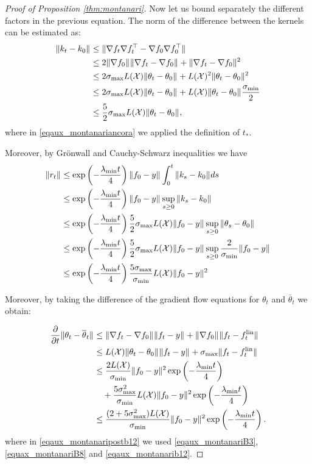 \documentclass{article}
\theoremstyle{definition}
\theoremstyle{remark}
\numberwithin{equation}{section}
\newcommand{\X}{\mathcal{X}}
\newcommand{\lin}{{\textup{lin}}}
\newcommand{\lammin}{\lambda_{\textup{min}}}
\newcommand{\sigmin}{\sigma_{\textup{min}}}
\newcommand{\sigmax}{\sigma_{\textup{max}}}
\newcommand{\norm}[2]{
    \|#1\|_{#2}
}
\newcommand{\partv}[1]{
    \frac{\partial}{\partial #1}
}
\begin{document}
\begin{proof}[Proof of Proposition \ref{thm:montanari}]
         Now let us bound separately the different factors in the previous equation.
         The norm of the difference between the kernels can be estimated as:
         \begin{align}
         	\norm{k_t-k_0}{} &\le \norm{\nabla f_t \nabla f_t^\top - \nabla f_0 \nabla f_0^\top}{}\\
            &\le 2\norm{\nabla f_0}{}\norm{\nabla f_t-\nabla f_0}{} + \norm{\nabla f_t-\nabla f_0}{}^2 \\
         	&\le 2\sigmax L(\X) \norm{\theta_t-\theta_0}{} + L(\X)^2 \norm{\theta_t-\theta_0}{}^2 \\
         	&\le \label{eqaux_montanariancora}2\sigmax L(\X) \norm{\theta_t-\theta_0}{} + L(\X) \norm{\theta_t-\theta_0}{}\frac{\sigmin}{2} \\
         	&\le \frac{5}{2}\sigmax L(\X) \norm{\theta_t-\theta_0}{},
         \end{align}
         where in \eqref{eqaux_montanariancora} we applied the definition of $t_*$.
         
         Moreover, by Grönwall and Cauchy-Schwarz inequalities we have
         \begin{align}
         	\norm{r_t}{} &\le \exp\left(-\frac{\lammin t}{4}\right)\norm{f_0-y}{}\int_0^t\norm{k_s-k_0}{}ds \\
            &\le\exp\left(-\frac{\lammin t}{4}\right)\norm{f_0-y}{}\sup_{s \ge 0}\norm{k_s-k_0}{} \\
            &\le\exp\left(-\frac{\lammin t}{4}\right)\frac{5}{2}\sigmax L(\X) \norm{f_0-y}{}\sup_{s \ge 0}\norm{\theta_s-\theta_0}{} \\
            &\le\exp\left(-\frac{\lammin t}{4}\right)\frac{5}{2}\sigmax L(\X) \norm{f_0-y}{}\sup_{s \ge 0}\frac{2}{\sigmin}\norm{f_0-y}{} \\
            &\label{eqaux_montanarib12}\le\exp\left(-\frac{\lammin t}{4}\right)\frac{5\sigmax}{\sigmin} L(\X) \norm{f_0-y}{}^2 \\
         \end{align}

    Moreover, by taking the difference of the gradient flow equations for $\theta_t$ and $\overline \theta_t$ we obtain:

\begin{align}
    \partv t \norm{\theta_t-\overline \theta_t}{} &\le \norm{\nabla f_t - \nabla f_0}{}\norm{f_t-y}{} + \norm{\nabla f_0}{}\norm{f_t-f_t^\lin}{} \\
    &\le L(\X) \norm{\theta_t-\theta_0}{}\norm{f_t-y}{} + \sigmax \norm{f_t-f_t^\lin}{}\\
    &\label{eqaux_montanaripostb12}\le \frac{2L(\X)}{\sigmin} \norm{f_0-y}{}^2 \exp\left(-\frac{\lammin t}{4}\right)\\
    &\quad + \frac{5\sigmax^2}{\sigmin} L(\X) \norm{f_0-y}{}^2 \exp\left(-\frac{\lammin t}{4}\right)\\
    &\le \frac{ (2+5\sigmax^2)L(\X)}{\sigmin} \norm{f_0-y}{}^2 \exp\left(-\frac{\lammin t}{4}\right).
\end{align}
where in \eqref{eqaux_montanaripostb12} we used \eqref{eqaux_montanariB3}, \eqref{equax_montanariB8} and \ref{eqaux_montanarib12}.


\end{proof}
\end{document}
